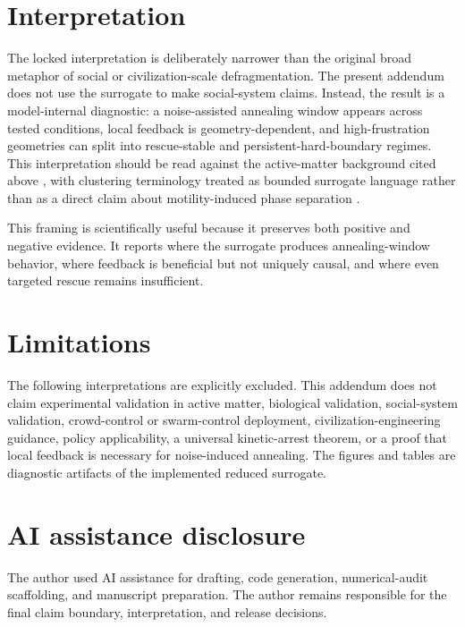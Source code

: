\documentclass[11pt]{article}
\begin{document}
\section{Interpretation}
The locked interpretation is deliberately narrower than the original broad metaphor of social or civilization-scale defragmentation. The present addendum does not use the surrogate to make social-system claims. Instead, the result is a model-internal diagnostic: a noise-assisted annealing window appears across tested conditions, local feedback is geometry-dependent, and high-frustration geometries can split into rescue-stable and persistent-hard-boundary regimes. This interpretation should be read against the active-matter background cited above \cite{marchetti2013,bechinger2016}, with clustering terminology treated as bounded surrogate language rather than as a direct claim about motility-induced phase separation \cite{cates2015}.

This framing is scientifically useful because it preserves both positive and negative evidence. It reports where the surrogate produces annealing-window behavior, where feedback is beneficial but not uniquely causal, and where even targeted rescue remains insufficient.

\section{Limitations}
The following interpretations are explicitly excluded. This addendum does not claim experimental validation in active matter, biological validation, social-system validation, crowd-control or swarm-control deployment, civilization-engineering guidance, policy applicability, a universal kinetic-arrest theorem, or a proof that local feedback is necessary for noise-induced annealing. The figures and tables are diagnostic artifacts of the implemented reduced surrogate.

\section*{AI assistance disclosure}
The author used AI assistance for drafting, code generation, numerical-audit scaffolding, and manuscript preparation. The author remains responsible for the final claim boundary, interpretation, and release decisions.
\end{document}
